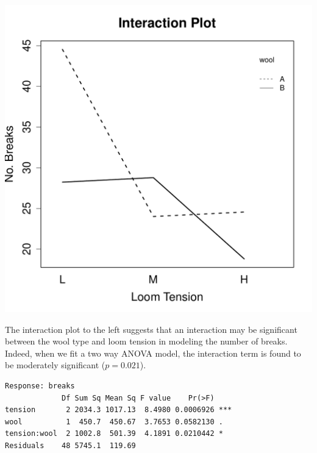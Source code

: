 \documentclass{homework}
\begin{document}
\begin{solution}
\begin{minipage}{.5\textwidth}
\includegraphics[width=\textwidth]{wool_interaction1.pdf}
\end{minipage}
\begin{minipage}{.5\textwidth}
The interaction plot to the left suggests that an interaction may be significant between the wool type and loom tension in modeling the number of breaks. Indeed, when we fit a two way ANOVA model, the interaction term is found to be moderately significant ($p=0.021$). 
{\small
\begin{verbatim}
Response: breaks
             Df Sum Sq Mean Sq F value    Pr(>F)    
tension       2 2034.3 1017.13  8.4980 0.0006926 ***
wool          1  450.7  450.67  3.7653 0.0582130 .  
tension:wool  2 1002.8  501.39  4.1891 0.0210442 *  
Residuals    48 5745.1  119.69                      
\end{verbatim}
}
\end{minipage}


\end{solution}
\end{document}
